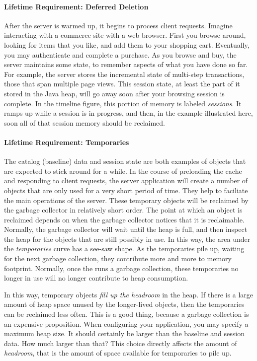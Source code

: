 \paragraph{Lifetime Requirement: Deferred Deletion}
After the server is warmed up, it begins to process client requests. Imagine
interacting with a commerce site with a web browser. First you browse around,
looking for items that you like, and add them to your shopping cart. Eventually,
you may authenticate and complete a purchase. As you browse and buy, the server
maintains some state, to remember aspects of what you have done so far. For
example, the server stores the incremental state of multi-step transactions,
those that span multiple page views.
 This session
state, at least the part of it stored in the Java heap, will go away soon after
your browsing session is complete. In the timeline figure, this portion of memory
is labeled \emph{sessions}. It ramps up while a session is in progress, and then,
in the example illustrated here, soon all of that session memory should be
reclaimed.

\paragraph{Lifetime Requirement: Temporaries}
The catalog (baseline) data and session state are both examples of objects that
are expected to stick around for a while.
 In the course of preloading the cache
and responding to client requests, the server application will create a number
of objects that are only used for a very short period of time. They help to
faciliate the main operations of the server.
These temporary objects will be reclaimed by the \jres garbage collector in
relatively short order. The point at which an object is reclaimed depends on when the garbage collector
notices that it is reclaimable. Normally, the garbage collector will wait until
the heap is full, and then inspect the heap for the objects that are still
possibly in use. In this way, the area under the \emph{temporaries} curve has a
see-saw shape. As the temporaries pile up, waiting for the next garbage
collection, they contribute more and more to memory footprint. Normally, once
the \jre runs a garbage collection, these temporaries no longer in use will no
longer contribute to heap consumption.

In this way, temporary objects
\emph{fill up the headroom} in the heap. If there is a
large amount of heap space unused by the longer-lived objects, then the
temporaries can be reclaimed less often. This is a good thing, because a
garbage collection is an expensive proposition.
  
When configuring your application, you may specify a maximum heap size. It
should certainly be larger than the baseline and session data. How much
larger than that? This choice directly affects the amount of \emph{headroom},
 that is the amount of space available for temporaries to pile up.

